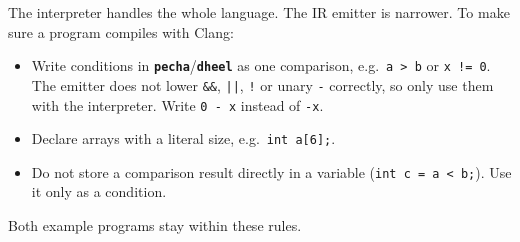 \documentclass[11pt,a4paper]{article}
\newcommand{\kw}[1]{\texttt{\textcolor{cInput}{\textbf{#1}}}}
\newcommand{\fn}[1]{\texttt{#1}}
\begin{document}
\begin{warnbox}
The interpreter handles the whole language. The IR emitter is narrower. To make sure a program compiles with Clang:
\begin{itemize}[leftmargin=*]
\item Write conditions in \kw{pecha}/\kw{dheel} as one comparison, e.g.\ \fn{a > b} or \fn{x != 0}. The emitter does not lower \fn{\&\&}, \fn{||}, \fn{!} or unary \fn{-} correctly, so only use them with the interpreter. Write \fn{0 - x} instead of \fn{-x}.
\item Declare arrays with a literal size, e.g.\ \fn{int a[6];}.
\item Do not store a comparison result directly in a variable (\fn{int c = a < b;}). Use it only as a condition.
\end{itemize}
Both example programs stay within these rules.
\end{warnbox}
\end{document}
